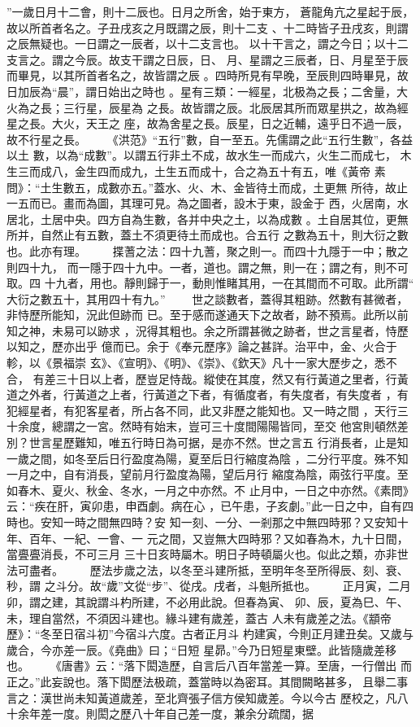 \documentclass{ctexart}
\begin{document}
''一歲日月十二會，則十二辰也。日月之所舍，始于東方， 蒼龍角亢之星起于辰，故以所首者名之。子丑戌亥之月既謂之辰，則十二支 、十二時皆子丑戌亥，則謂之辰無疑也。一日謂之一辰者，以十二支言也。 以十干言之，謂之今日；以十二支言之。謂之今辰。故支干謂之日辰，日、 月、星謂之三辰者，日、月星至于辰而畢見，以其所首者名之，故皆謂之辰 。四時所見有早晚，至辰則四時畢見，故日加辰為``晨''，謂日始出之時也 。星有三類：一經星，北极為之長；二舍量，大火為之長；三行星，辰星為 之長。故皆謂之辰。北辰居其所而眾星拱之，故為經星之長。大火，天王之 座，故為舍星之長。辰星，日之近輔，遠乎日不過一辰，故不行星之長。 　　《洪范》``五行''數，自一至五。先儒謂之此``五行生數''，各益以土 數，以為``成數''。以謂五行非土不成，故水生一而成六，火生二而成七， 木生三而成八，金生四而成九，土生五而成十，合之為五十有五，唯《黃帝 素問》：``土生數五，成數亦五。''蓋水、火、木、金皆待土而成，土更無 所待，故止一五而已。畫而為圖，其理可見。為之圖者，設木于東，設金于 西，火居南，水居北，土居中央。四方自為生數，各并中央之土，以為成數 。土自居其位，更無所并，自然止有五數，蓋土不須更待土而成也。合五行 之數為五十，則大衍之數也。此亦有理。 　　揲蓍之法：四十九蓍，聚之則一。而四十九隱于一中；散之則四十九， 而一隱于四十九中。一者，道也。謂之無，則一在；謂之有，則不可取。四 十九者，用也。靜則歸于一，動則惟睹其用，一在其間而不可取。此所謂`` 大衍之數五十，其用四十有九。'' 　　世之談數者，蓋得其粗跡。然數有甚微者，非恃歷所能知，況此但跡而 已。至于感而遂通天下之故者，跡不預焉。此所以前知之神，未易可以跡求 ，況得其粗也。余之所謂甚微之跡者，世之言星者，恃歷以知之，歷亦出乎 億而已。余于《奉元歷序》論之甚詳。治平中，金、火合于軫，以《景福崇 玄》、《宣明》、《明》、《崇》、《欽天》凡十一家大歷步之，悉不合， 有差三十日以上者，歷豈足恃哉。縱使在其度，然又有行黃道之里者，行黃 道之外者，行黃道之上者，行黃道之下者，有循度者，有失度者，有失度者 ，有犯經星者，有犯客星者，所占各不同，此又非歷之能知也。又一時之間 ，天行三十余度，總謂之一宮。然時有始末，豈可三十度間陽陽皆同，至交 他宮則頓然差別？世言星歷難知，唯五行時日為可据，是亦不然。世之言五 行消長者，止是知一歲之間，如冬至后日行盈度為陽，夏至后日行縮度為陰 ，二分行平度。殊不知一月之中，自有消長，望前月行盈度為陽，望后月行 縮度為陰，兩弦行平度。至如春木、夏火、秋金、冬水，一月之中亦然。不 止月中，一日之中亦然。《素問》云：``疾在肝，寅卯患，申酉劇。病在心 ，已午患，子亥劇。''此一日之中，自有四時也。安知一時之間無四時？安 知一刻、一分、一剎那之中無四時邪？又安知十年、百年、一紀、一會、一 元之間，又豈無大四時邪？又如春為木，九十日間，當亹亹消長，不可三月 三十日亥時屬木。明日子時頓屬火也。似此之類，亦非世法可盡者。 　　歷法步歲之法，以冬至斗建所抵，至明年冬至所得辰、刻、衰、秒，謂 之斗分。故``歲''文從``步''、從戌。戌者，斗魁所抵也。 　　正月寅，二月卯，謂之建，其說謂斗杓所建，不必用此說。但春為寅、 卯、辰，夏為巳、午、未，理自當然，不須因斗建也。緣斗建有歲差，蓋古 人未有歲差之法。《顓帝歷》：``冬至日宿斗初''今宿斗六度。古者正月斗 杓建寅，今則正月建丑矣。又歲与歲合，今亦差一辰。《堯曲》曰；``日短 星昴。''今乃日短星東壁。此皆隨歲差移也。 　　《唐書》云：``落下閎造歷，自言后八百年當差一算。至唐，一行僧出 而正之。''此妄說也。落下閎歷法极疏，蓋當時以為密耳。其間闕略甚多， 且舉二事言之：漢世尚未知黃道歲差，至北齊張子信方侯知歲差。今以今古 歷校之，凡八十余年差一度。則閎之歷八十年自己差一度，兼余分疏闊，据 
\end{document}
